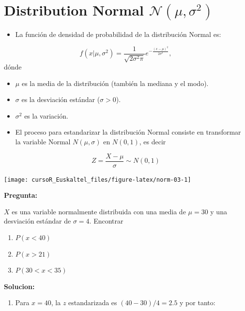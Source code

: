 \documentclass[]{book}
\providecommand{\tightlist}{%
  \setlength{\itemsep}{0pt}\setlength{\parskip}{0pt}}
\begin{document}
\section{\texorpdfstring{Distribution Normal
\(\mathcal{N}(\mu,\sigma^2)\)}{Distribution Normal \textbackslash{}mathcal\{N\}(\textbackslash{}mu,\textbackslash{}sigma\^{}2)}}\label{distribution-normal-mathcalnmusigma2}

\begin{itemize}
\tightlist
\item
  La función de densidad de probabilidad de la distribución Normal es:
\end{itemize}

\[
f(x | \mu,\sigma^2) = \frac{1}{\sqrt{2\sigma^2\pi}} e ^{-\frac{(x-\mu)^2}{2\sigma^2}},
\] dónde

\begin{itemize}
\item
  \(\mu\) es la media de la distribución (también la mediana y el modo).
\item
  \(\sigma\) es la desviación estándar (\(\sigma>0\)).
\item
  \(\sigma^2\) es la variación.
\item
  El proceso para estandarizar la distribución Normal consiste en
  transformar la variable Normal \(N(\mu,\sigma)\) en \(N(0,1)\), es
  decir
\end{itemize}

\[
Z = \frac{X-\mu}{\sigma} \sim N(0,1)
\]

\begin{center}\texttt{[image: cursoR\_Euskaltel\_files/figure-latex/norm-03-1]} \end{center}

\textbf{Pregunta:}

\(X\) es una variable normalmente distribuida con una media de
\(\mu = 30\) y una desviación estándar de \(\sigma = 4\). Encontrar

\begin{enumerate}
\def\labelenumi{\alph{enumi})}
\item
  \(P(x<40)\)
\item
  \(P(x>21)\)
\item
  \(P(30<x<35)\)
\end{enumerate}

\textbf{Solucion:}

\begin{enumerate}
\def\labelenumi{\alph{enumi})}
\tightlist
\item
  Para \(x=40\), la \(z\) estandarizada es \((40-30)/4=2.5\) y por
  tanto:
\end{enumerate}
\end{document}
